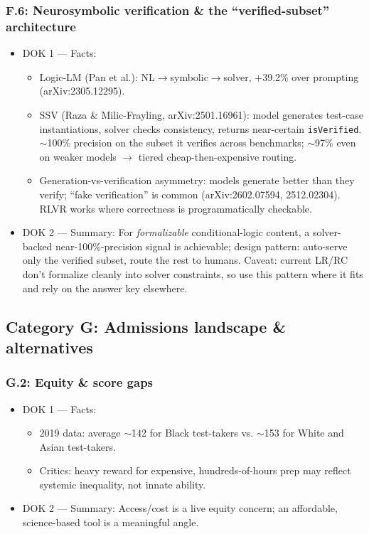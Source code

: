 \documentclass[11pt]{article}
\begin{document}
\subsubsection*{F.6: Neurosymbolic verification \& the \enquote{verified-subset} architecture}
\begin{itemize}
\item DOK 1 --- Facts:
\begin{itemize}
\item Logic-LM (Pan et al.): NL$\rightarrow$symbolic$\rightarrow$solver, +39.2\% over prompting (arXiv:2305.12295).
\item SSV (Raza \& Milic-Frayling, arXiv:2501.16961): model generates test-case instantiations, solver checks consistency, returns near-certain \texttt{isVerified}. $\sim$100\% precision on the subset it verifies across benchmarks; $\sim$97\% even on weaker models $\rightarrow$ tiered cheap-then-expensive routing.
\item Generation-vs-verification asymmetry: models generate better than they verify; \enquote{fake verification} is common (arXiv:2602.07594, 2512.02304). RLVR works where correctness is programmatically checkable.
\end{itemize}
\item DOK 2 --- Summary: For \textit{formalizable} conditional-logic content, a solver-backed near-100\%-precision signal is achievable; design pattern: auto-serve only the verified subset, route the rest to humans. Caveat: current LR/RC don't formalize cleanly into solver constraints, so use this pattern where it fits and rely on the answer key elsewhere.
\end{itemize}

\subsection*{Category G: Admissions landscape \& alternatives}
\subsubsection*{G.2: Equity \& score gaps}
\begin{itemize}
\item DOK 1 --- Facts:
\begin{itemize}
\item 2019 data: average $\sim$142 for Black test-takers vs. $\sim$153 for White and Asian test-takers.
\item Critics: heavy reward for expensive, hundreds-of-hours prep may reflect systemic inequality, not innate ability.
\end{itemize}
\item DOK 2 --- Summary: Access/cost is a live equity concern; an affordable, science-based tool is a meaningful angle.
\end{itemize}
\end{document}
